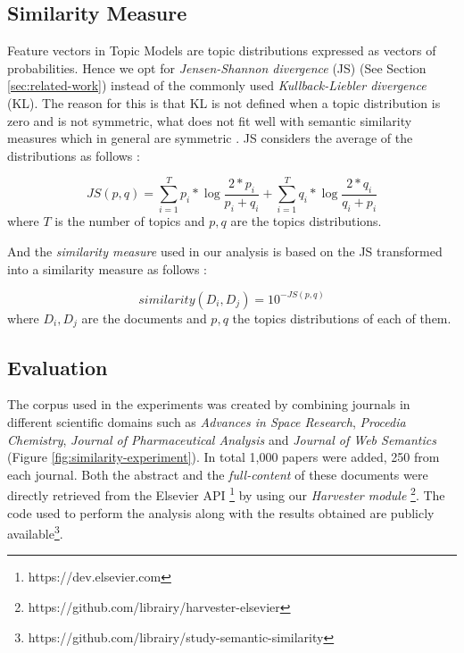 \subsection{Similarity Measure}
Feature vectors in Topic Models are topic distributions expressed as vectors of probabilities. Hence we opt for \textit{Jensen-Shannon divergence} (JS) (See Section \ref{sec:related-work})  instead of the commonly used \textit{Kullback-Liebler divergence} (KL). The reason for this is that KL is not defined when a topic distribution is zero and is not symmetric, what does not fit well with semantic similarity measures which in general are symmetric \citep{Rus2013}. JS considers the average of the distributions as follows :

\begin{equation}
JS(p,q) = \sum\limits_{i=1}^T p_{i}*\log \frac{2*p_{i}}{p_{i}+q_{i}}  +  \sum\limits_{i=1}^T q_{i}*\log \frac{2*q_{i}}{q_{i}+p_{i}}
\label{eq:jsd}
\end{equation}
where  $T$ is the number of topics and $p,q$ are the topics distributions.

And the \textit{similarity measure} used in our analysis is based on the JS transformed into a similarity measure as follows \citep{Dagan1998} :

\begin{equation}
similarity(D_i , D_j) = 10^{- JS(p,q)}
\label{eq:simcontent}
\end{equation}
where  $D_i,D_j$ are the documents and $p,q$ the topics distributions of each of them.

\subsection{Evaluation}
\label{sec:topic-relevance-experiments}

The corpus used in the experiments was created by combining journals in different scientific domains such as \textit{Advances in Space Research}, \textit{Procedia Chemistry}, \textit{Journal of Pharmaceutical Analysis} and \textit{Journal of Web Semantics} (Figure \ref{fig:similarity-experiment}). In total 1,000 papers were added, 250 from each journal. Both the abstract and the \textit{full-content} of these documents were directly retrieved from the Elsevier API \footnote{https://dev.elsevier.com} by using our \textit{Harvester module} \footnote{https://github.com/librairy/harvester-elsevier}. The code used to perform the analysis along with the results obtained are publicly available\footnote{https://github.com/librairy/study-semantic-similarity}.

